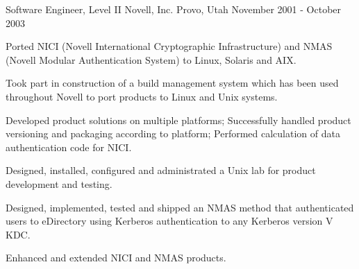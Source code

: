 \begin{cventries}
 \cventry
   {Software Engineer, Level II} %
   {Novell, Inc.} %
   {Provo, Utah} %
   {November 2001 - October 2003} %
   {
  	 \begin{cvitems} %
		\item {Ported NICI (Novell International Cryptographic Infrastructure) and NMAS (Novell Modular Authentication System) to Linux, Solaris and AIX.}
		\item {Took part in construction of a build management system which has been used throughout Novell to port products to Linux and Unix systems.}
		\item {Developed product solutions on multiple platforms; Successfully handled product versioning and packaging according to platform; Performed calculation of data authentication code for NICI.}
		\item {Designed, installed, configured and administrated a Unix lab for product development and testing.}
		\item {Designed, implemented, tested and shipped an NMAS method that authenticated users to eDirectory using Kerberos authentication to any Kerberos version V KDC.}
		\item {Enhanced and extended NICI and NMAS products.}
  	 \end{cvitems}
   }
  

\end{cventries}
